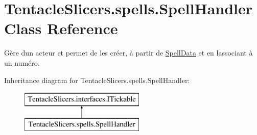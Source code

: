 \hypertarget{class_tentacle_slicers_1_1spells_1_1_spell_handler}{}\section{Tentacle\+Slicers.\+spells.\+Spell\+Handler Class Reference}
\label{class_tentacle_slicers_1_1spells_1_1_spell_handler}


Gère d\textquotesingle{}un acteur et permet de les créer, à partir de \hyperlink{class_tentacle_slicers_1_1spells_1_1_spell_data}{Spell\+Data} et en l\textquotesingle{}associant à un numéro.  


Inheritance diagram for Tentacle\+Slicers.\+spells.\+Spell\+Handler\+:\begin{figure}[H]
\begin{center}
\leavevmode
\includegraphics[height=2.000000cm]{class_tentacle_slicers_1_1spells_1_1_spell_handler}
\end{center}
\end{figure}
